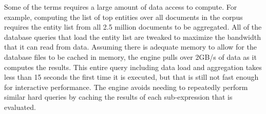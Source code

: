 Some of the terms requires a large amount of data access to compute.  For example, computing the list of top entities over all documents in the corpus requires the entity list from all 2.5 million documents to be aggregated.  All of the database queries that load the entity list are tweaked to maximize the bandwidth that it can read from data.  Assuming there is adequate memory to allow for the database files to be cached in memory, the engine pulls over 2GB/s of data as it computes the results.  This entire query including data load and aggregation takes less than 15 seconds the first time it is executed, but that is still not fast enough for interactive performance.  The engine avoids needing to repeatedly perform similar hard queries by caching the results of each sub-expression that is evaluated.